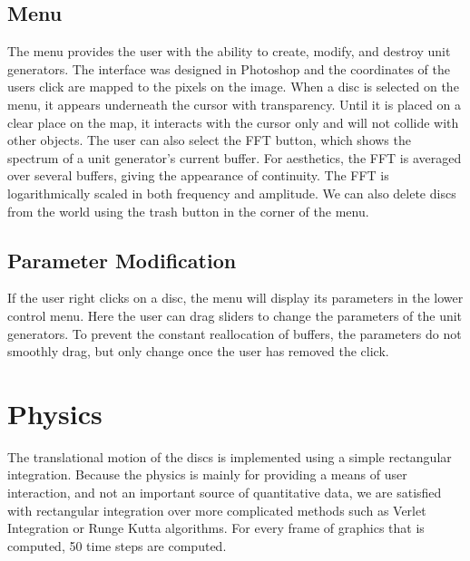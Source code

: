 \documentclass[pdftext,twoside,10pt]{article}
\begin{document}
\subsection{Menu}
The menu provides the user with the ability to create, modify, and destroy unit generators. The interface was designed in Photoshop and the coordinates of the users click are mapped to the pixels on the image. When a disc is selected on the menu, it appears underneath the cursor with transparency. Until it is placed on a clear place on the map, it interacts with the cursor only and will not collide with other objects. The user can also select the FFT button, which shows the spectrum of a unit generator's current buffer. For aesthetics, the FFT is averaged over several buffers, giving the appearance of continuity. The FFT is logarithmically scaled in both frequency and amplitude. We can also delete discs from the world using the trash button in the corner of the menu.

\subsection{Parameter Modification}
If the user right clicks on a disc, the menu will display its parameters in the lower control menu. Here the user can drag sliders to change the parameters of the unit generators. To prevent the constant reallocation of buffers, the parameters do not smoothly drag, but only change once the user has removed the click.

\vspace{1cm}


\section{Physics}
The translational motion of the discs is implemented using a simple rectangular integration. Because the physics is mainly for providing a means of user interaction, and not an important source of quantitative data, we are satisfied with rectangular integration over more complicated methods such as Verlet Integration or Runge Kutta algorithms. For every frame of graphics that is computed, 50 time steps are computed.
\end{document}
